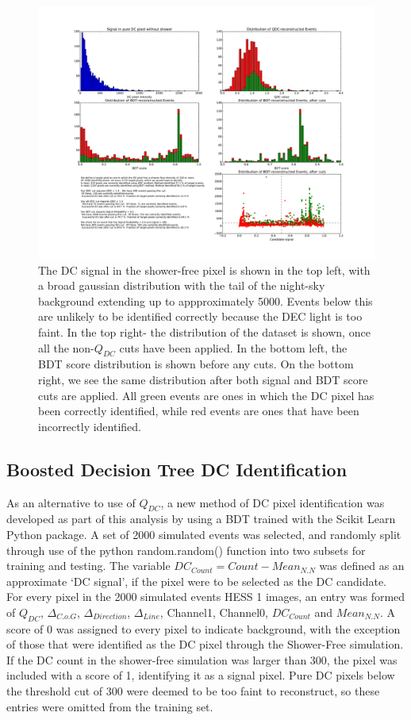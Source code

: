 \documentclass[]{article}
\begin{document}
\begin{figure}
\begin{center}
\includegraphics[width=\textwidth]{cutdistributionhess1None}
\caption{The DC signal in the shower-free pixel is shown in the top left, with a broad gaussian distribution with the tail of the night-sky background extending up to appproximately 5000. Events below this are unlikely to be identified correctly because the DEC light is too faint. In the top right- the distribution of the dataset is shown, once all the non-$Q_{DC}$ cuts have been applied. In the bottom left, the BDT score distribution is shown before any cuts. On the bottom right, we see the same distribution after both signal and BDT score cuts are applied. All green events are ones in which the DC pixel has been correctly identified, while red events are ones that have been incorrectly identified.}
\label{fig:cutdistribution}
\end{center}
\end{figure} 

\subsection{Boosted Decision Tree DC Identification}  As an alternative to use of $Q_{DC}$, a new method of DC pixel identification was developed as part of this analysis by using a BDT trained with the Scikit Learn Python package. A set of 2000 simulated events was selected, and randomly split through use of the python random.random() function into two subsets for training and testing. The variable $DC_{Count} = Count-Mean_{N.N}$ was defined as an approximate \textquoteleft DC signal', if the pixel were to be selected as the DC candidate. For every pixel in the 2000 simulated events HESS 1 images, an entry was formed of $Q_{DC}$, $ \Delta_{C.o.G}$, $\Delta_{Direction}$, $\Delta_{Line}$, Channel1, Channel0, $DC_{Count}$ and $Mean_{N.N}$. A score of 0 was assigned to every pixel to indicate background, with the exception of those that were identified as the DC pixel through the Shower-Free simulation. If the DC count in the shower-free simulation was larger than 300, the pixel was included with a score of 1, identifying it as a signal pixel. Pure DC pixels below the threshold cut of 300 were deemed to be too faint to reconstruct, so these entries were omitted from the training set.
\end{document}
